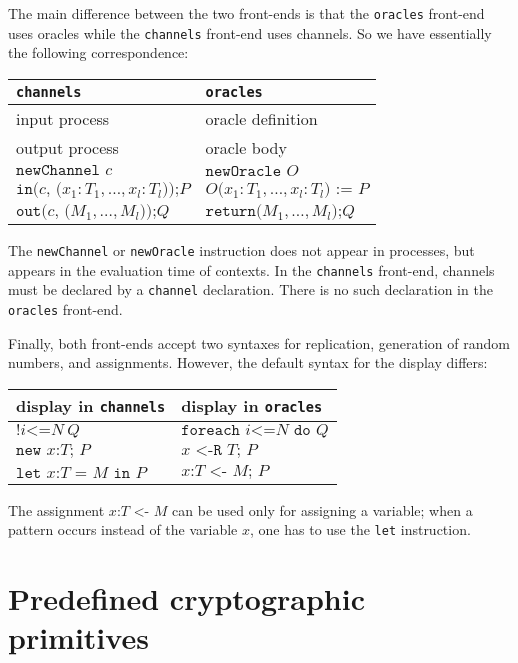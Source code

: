 \documentclass{article}
\begin{document}
The main difference between the two front-ends is that the \texttt{oracles}
front-end uses oracles while the \texttt{channels} front-end uses channels.
So we have essentially the following correspondence:
\begin{center}
\begin{tabular}{l|l}
\texttt{channels}&\texttt{oracles}\\
\hline
input process& oracle definition\\
output process& oracle body\\
$\texttt{newChannel }c$& $\texttt{newOracle }O$\\
$\texttt{in(}c\texttt{, (}x_1:T_1, \ldots, x_l:T_l\texttt{));}P$&$O\texttt{(}x_1:T_1, \ldots, x_l:T_l\texttt{) := }P$\\
$\texttt{out(}c\texttt{, (}M_1, \ldots, M_l\texttt{));}Q$&$\texttt{return(}M_1, \ldots, M_l\texttt{);}Q$\\
\end{tabular}
\end{center}
The \texttt{newChannel} or \texttt{newOracle} instruction does not appear
in processes, but appears in the evaluation time of contexts.
In the \texttt{channels} front-end, channels must be declared by a
\texttt{channel} declaration. There is no such declaration in the 
\texttt{oracles} front-end.

Finally, both front-ends accept two syntaxes for replication,
generation of random numbers, and assignments. However, 
the default syntax for the display differs:
\begin{center}
\begin{tabular}{l|l}
display in \texttt{channels}&display in \texttt{oracles}\\
\hline
$\texttt{!}i\texttt{<=}N\ Q$& $\texttt{foreach }i\texttt{<=}N\texttt{ do }Q$\\
$\texttt{new }x\texttt{:}T\texttt{; }P$&$x\texttt{ <-R }T\texttt{; }P$\\
$\texttt{let }x\texttt{:}T\texttt{ = }M\texttt{ in }P$&$x\texttt{:}T\texttt{ <- }M\texttt{; }P$\\
\end{tabular}
\end{center}
The assignment $x\texttt{:}T\texttt{ <- }M$ can be
used only for assigning a variable; when a pattern occurs instead
of the variable $x$, one has to use the \texttt{let} instruction.

\section{Predefined cryptographic primitives}\label{sect:prim}
\end{document}
